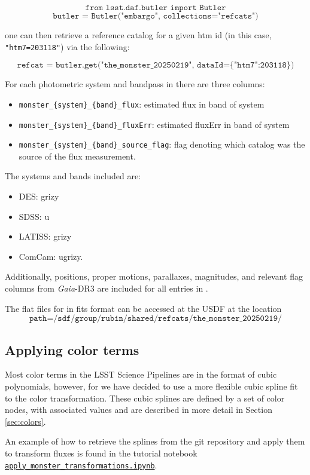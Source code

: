 $$\texttt{from lsst.daf.butler import Butler}$$
$$\texttt{butler = Butler("embargo", collections="refcats")}$$

one can then retrieve a reference catalog for a given htm id (in this case, \texttt{"htm7=203118"}) via the following:

$$\texttt{refcat = butler.get("the\_monster\_20250219", dataId=\{"htm7":203118\})}$$

For each photometric system and bandpass in \monster there are three columns:
\begin{itemize}
    \item \texttt{monster\_\{system\}\_\{band\}\_flux}: estimated flux in band of system
    \item \texttt{monster\_\{system\}\_\{band\}\_fluxErr}: estimated fluxErr in band of system
    \item \texttt{monster\_\{system\}\_\{band\}\_source\_flag}: flag denoting which catalog was the source of the flux measurement.
\end{itemize}

The systems and bands included are:
\begin{itemize}
    \item DES: grizy
    \item SDSS: u
    \item LATISS: grizy
    \item ComCam: ugrizy.
\end{itemize}

Additionally, positions, proper motions, parallaxes, magnitudes, and relevant flag columns from \emph{Gaia}-DR3 are included for all entries in \monster.

The flat files for \monster in fits format can be accessed at the USDF at the location
$$\texttt{path=/sdf/group/rubin/shared/refcats/the\_monster\_20250219/}$$

\subsection{Applying color terms}
Most color terms in the LSST Science Pipelines are in the format of cubic polynomials, however, for \monster we have decided to use a more flexible cubic spline fit to the color transformation.
These cubic splines are defined by a set of color nodes, with associated values and are described in more detail in Section \ref{sec:colors}.

An example of how to retrieve the splines from the git repository and apply them to transform fluxes is found in the tutorial notebook \href{https://github.com/lsst-dm/dmtn-277/blob/main/notebooks/apply_monster_transformations.ipynb}{\texttt{apply\_monster\_transformations.ipynb}}.

